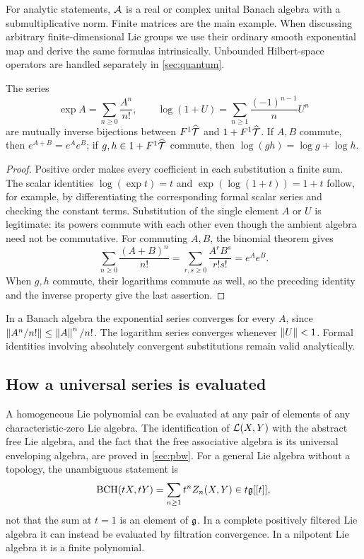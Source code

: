 For analytic statements, $\mathcal A$ is a real or complex unital Banach algebra with a submultiplicative norm. Finite matrices are the main example. When discussing arbitrary finite-dimensional Lie groups we use their ordinary smooth exponential map and derive the same formulas intrinsically. Unbounded Hilbert-space operators are handled separately in \cref{sec:quantum}.

\begin{lemma}\label{lem:exp-log}
The series
\begin{equation}\label{eq:exp-log}
 \exp A=\sum_{n\geq0}\frac{A^n}{n!},\qquad
 \log(1+U)=\sum_{n\geq1}\frac{(-1)^{n-1}}{n}U^n
\end{equation}
are mutually inverse bijections between $F^1\widehat{\mathcal T}$ and $1+F^1\widehat{\mathcal T}$.
If $A,B$ commute, then $e^{A+B}=e^Ae^B$; if $g,h\in1+F^1\widehat{\mathcal T}$ commute, then $\log(gh)=\log g+\log h$.
\end{lemma}
\begin{proof}
Positive order makes every coefficient in each substitution a finite sum. The scalar identities $\log(\exp t)=t$ and $\exp(\log(1+t))=1+t$ follow, for example, by differentiating the corresponding formal scalar series and checking the constant terms. Substitution of the single element $A$ or $U$ is legitimate: its powers commute with each other even though the ambient algebra need not be commutative. For commuting $A,B$, the binomial theorem gives
\[
 \sum_{n\geq0}\frac{(A+B)^n}{n!}
 =\sum_{r,s\geq0}\frac{A^rB^s}{r!s!}=e^Ae^B.
\]
When $g,h$ commute, their logarithms commute as well, so the preceding identity and the inverse property give the last assertion.
\end{proof}

In a Banach algebra the exponential series converges for every $A$, since
$\left\lVert A^n/n!\right\rVert\leq\left\lVert A\right\rVert^n/n!$. The logarithm series converges whenever $\left\lVert U\right\rVert<1$. Formal identities involving absolutely convergent substitutions remain valid analytically.

\subsection{How a universal series is evaluated}
A homogeneous Lie polynomial can be evaluated at any pair of elements of any characteristic-zero Lie algebra. The identification of $\mathcal L(X,Y)$ with the abstract free Lie algebra, and the fact that the free associative algebra is its universal enveloping algebra, are proved in \cref{sec:pbw}. For a general Lie algebra without a topology, the unambiguous statement is
\[
 \operatorname{BCH}(tX,tY)=\sum_{n\geq1}t^n Z_n(X,Y)\in t\mathfrak g[[t]],
\]
not that the sum at $t=1$ is an element of $\mathfrak g$. In a complete positively filtered Lie algebra it can instead be evaluated by filtration convergence. In a nilpotent Lie algebra it is a finite polynomial.

